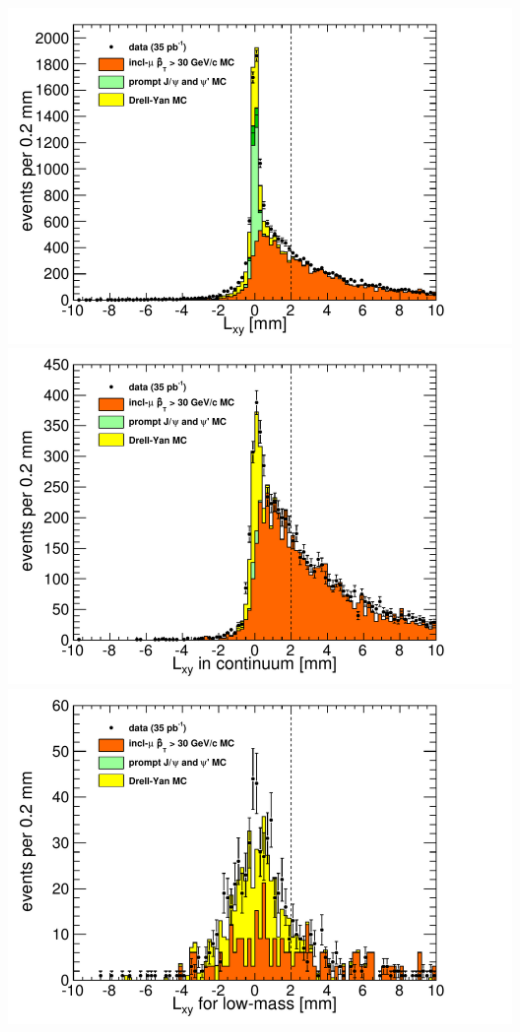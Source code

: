 \documentclass[compress]{beamer}
\begin{document}
\begin{frame}
\includegraphics[width=0.33\linewidth]{support_lxy_all.pdf}
\includegraphics[width=0.33\linewidth]{support_lxy_continuum.pdf}
\includegraphics[width=0.33\linewidth]{support_lxy_lowmass.pdf}
\end{frame}
\end{document}
